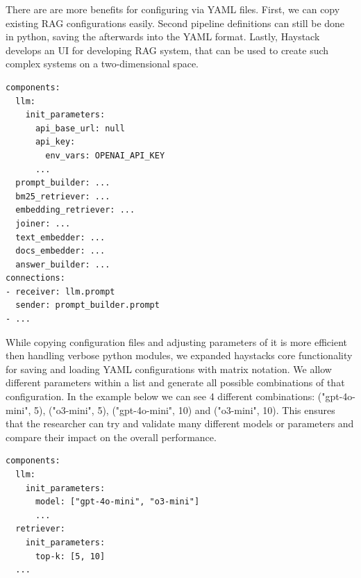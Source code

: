 There are are more benefits for configuring via YAML files. First, we can copy existing RAG configurations easily. Second pipeline definitions can still be done in python, saving the afterwards into the YAML format. Lastly, Haystack develops an UI\cite{haystack-ui} for developing RAG system, that can be used to create such complex systems on a two-dimensional space.

\begin{verbatim}
components:
  llm:
    init_parameters:
      api_base_url: null
      api_key:
        env_vars: OPENAI_API_KEY
      ...
  prompt_builder: ...
  bm25_retriever: ...
  embedding_retriever: ...
  joiner: ...
  text_embedder: ...
  docs_embedder: ...
  answer_builder: ...
connections:
- receiver: llm.prompt
  sender: prompt_builder.prompt
- ...
\end{verbatim}

While copying configuration files and adjusting parameters of it is more efficient then handling verbose python modules, we expanded haystacks core functionality for saving and loading YAML configurations with matrix notation.
We allow different parameters within a list and generate all possible combinations of that configuration. In the example below we can see 4 different combinations: ("gpt-4o-mini", 5), ("o3-mini", 5), ("gpt-4o-mini", 10) and ("o3-mini", 10). This ensures that the researcher can try and validate many different models or parameters and compare their impact on the overall performance.

\begin{verbatim}
components:
  llm:
    init_parameters:
      model: ["gpt-4o-mini", "o3-mini"]
      ...
  retriever:
    init_parameters:
      top-k: [5, 10]
  ...
\end{verbatim}


